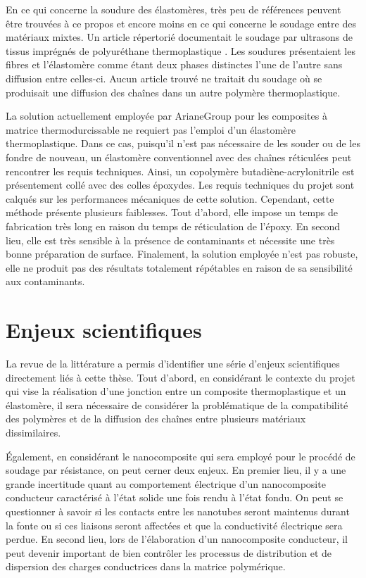 \FloatBarrier
En ce qui concerne la soudure des élastomères, très peu de références peuvent être trouvées à ce propos et encore moins en ce qui concerne le soudage entre des matériaux mixtes. 
Un article répertorié documentait le soudage par ultrasons de tissus imprégnés de polyuréthane thermoplastique \cite{Hollande1998}. 
Les soudures présentaient les fibres et l'élastomère comme étant deux phases distinctes l'une de l'autre sans diffusion entre celles-ci. 
Aucun article trouvé ne traitait du soudage où se produisait une diffusion des chaînes dans un autre polymère thermoplastique. 

La solution actuellement employée par ArianeGroup pour les composites à matrice thermodurcissable ne requiert pas l'emploi d'un élastomère thermoplastique. 
Dans ce cas, puisqu'il n'est pas nécessaire de les souder ou de les fondre de nouveau, un élastomère conventionnel avec des chaînes réticulées peut rencontrer les requis techniques. 
Ainsi, un copolymère butadiène-acrylonitrile est présentement collé avec des colles époxydes. 
Les requis techniques du projet sont calqués sur les performances mécaniques de cette solution. 
Cependant, cette méthode présente plusieurs faiblesses. 
Tout d'abord, elle impose un temps de fabrication très long en raison du temps de réticulation de l'époxy. 
En second lieu, elle est très sensible à la présence de contaminants et nécessite une très bonne préparation de surface. 
Finalement, la solution employée n'est pas robuste, elle ne produit pas des résultats totalement répétables en raison de sa sensibilité aux contaminants. 

\section{Enjeux scientifiques}

La revue de la littérature a permis d'identifier une série d'enjeux scientifiques directement liés à cette thèse. 
Tout d'abord, en considérant le contexte du projet qui vise la réalisation d'une jonction entre un composite thermoplastique et un élastomère, il sera nécessaire de considérer la problématique de la compatibilité des polymères et de la diffusion des chaînes entre plusieurs matériaux dissimilaires. 

Également, en considérant le nanocomposite qui sera employé pour le procédé de soudage par résistance, on peut cerner deux enjeux. 
En premier lieu, il y a une grande incertitude quant au comportement électrique d'un nanocomposite conducteur caractérisé à l'état solide une fois rendu à l'état fondu. 
On peut se questionner à savoir si les contacts entre les nanotubes seront maintenus durant la fonte ou si ces liaisons seront affectées et que la conductivité électrique sera perdue. 
En second lieu, lors de l'élaboration d'un nanocomposite conducteur, il peut devenir important de bien contrôler les processus de distribution et de dispersion des charges conductrices dans la matrice polymérique. 




